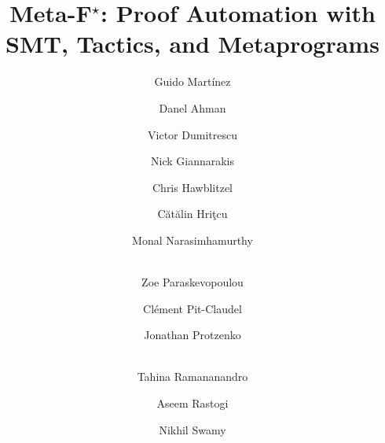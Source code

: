 \documentclass[runningheads]{llncs}
\newcommand\metafstar{Meta-F$^\star$\xspace}
\begin{document}
%
\def\titlestr{\metafstar: Proof Automation with \\SMT, Tactics, and Metaprograms}
\title{\titlestr}
%

\ifpages
\let\oldsection\section
\renewcommand\section{\clearpage\oldsection}
\fi

\author{
    Guido Mart\'inez \and
    Danel Ahman \and
    Victor Dumitrescu \and
    Nick Giannarakis \and
    Chris Hawblitzel \and
    C\u{a}t\u{a}lin Hri\c{t}cu \and
    Monal Narasimhamurthy \and\\
    Zoe Paraskevopoulou \and
    Cl\'ement Pit-Claudel \and
    Jonathan Protzenko \and\\
    Tahina Ramananandro \and
    Aseem Rastogi \and
    Nikhil Swamy
}
%
%
%
\maketitle              %
%
\end{document}
